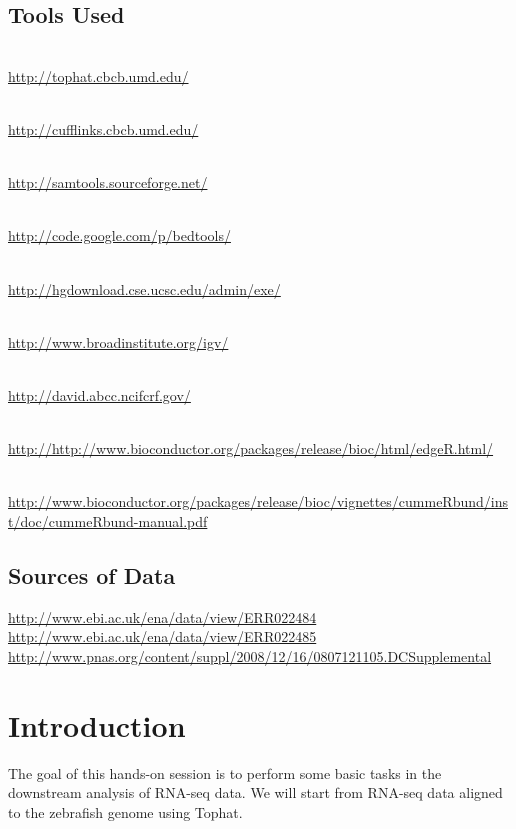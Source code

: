 \subsection{Tools Used}
\begin{description}[style=multiline,labelindent=0cm,align=left,leftmargin=1cm]
  \item[Tophat] \hfill\\
    \url{http://tophat.cbcb.umd.edu/}
  \item[Cufflinks] \hfill\\
    \url{http://cufflinks.cbcb.umd.edu/}
  \item[Samtools] \hfill\\
    \url{http://samtools.sourceforge.net/}
  \item[BEDTools] \hfill\\
    \url{http://code.google.com/p/bedtools/}
  \item[UCSC tools] \hfill\\
    \url{http://hgdownload.cse.ucsc.edu/admin/exe/}
  \item[IGV] \hfill\\
    \url{http://www.broadinstitute.org/igv/}
  \item[DAVID Functional Analysis] \hfill\\
    \url{http://david.abcc.ncifcrf.gov/}
  \item[edgeR pakcage] \hfill\\
    \url{http://http://www.bioconductor.org/packages/release/bioc/html/edgeR.html/}
  \item[CummeRbund manual] \hfill\\
    \url{http://www.bioconductor.org/packages/release/bioc/vignettes/cummeRbund/inst/doc/cummeRbund-manual.pdf}
\end{description}

\subsection{Sources of Data}
\url{http://www.ebi.ac.uk/ena/data/view/ERR022484}\\
\url{http://www.ebi.ac.uk/ena/data/view/ERR022485}\\
\url{http://www.pnas.org/content/suppl/2008/12/16/0807121105.DCSupplemental}

\newpage

\section{Introduction}
The goal of this hands-on session is to perform some basic tasks in the
downstream analysis of RNA-seq data. We will start from RNA-seq data aligned to
the zebrafish genome using Tophat.

